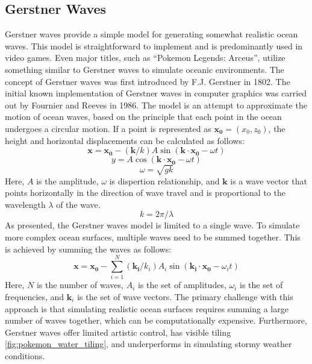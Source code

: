 \subsection{Gerstner Waves}
Gerstner waves provide a simple model for generating somewhat realistic ocean waves. This model is straightforward to implement and is predominantly used in video games. Even major titles, such as “Pokemon Legends: Arceus”, utilize something similar to Gerstner waves to simulate oceanic environments.
The concept of Gerstner waves was first introduced by F.J. Gerstner \cite{Franz1809} in 1802. The initial known implementation of Gerstner waves in computer graphics was carried out by Fournier and Reeves \cite{AlainWilliam1986} in 1986. The model is an attempt to approximate the motion of ocean waves, based on the principle that each point in the ocean undergoes a circular motion.
If a point is represented as $\mathbf{x_0} = (x_0, z_0)$, the height and horizontal displacements can be calculated as follows:
\begin{equation}
\mathbf{x} = \mathbf{x_0} - (\mathbf{k} / k) A \sin(\mathbf{k} \cdot \mathbf{x_0} - \omega t)
\end{equation}
\begin{equation}
    y = A \cos(\mathbf{k} \cdot \mathbf{x_0} - \omega t)
\end{equation}
\begin{equation}
    \omega = \sqrt{gk}
\end{equation}
Here, $A$ is the amplitude, $\omega$ is dispertion relationship, and $\mathbf{k}$ is a wave vector that points horizontally in the direction of wave travel and is proportional to the wavelength $\lambda$ of the wave.
\begin{equation}
k = 2 \pi / \lambda
\end{equation}
As presented, the Gerstner waves model is limited to a single wave. To simulate more complex ocean surfaces, multiple waves need to be summed together. This is achieved by summing the waves as follows:
\begin{equation}
\mathbf{x} = \mathbf{x_0} - \sum_{i=1}^{N} (\mathbf{k_i} / k_i) A_i \sin(\mathbf{k_i} \cdot \mathbf{x_0} - \omega_i t)
\end{equation}
Here, $N$ is the number of waves, $A_i$ is the set of amplitudes, $\omega_i$ is the set of frequencies, and $\mathbf{k}_i$ is the set of wave vectors.
The primary challenge with this approach is that simulating realistic ocean surfaces requires summing a large number of waves together, which can be computationally expensive. 
Furthermore, Gerstner waves offer limited artistic control, has visible tiling \ref{fig:pokemon_water_tiling}, and underperforms in simulating stormy weather conditions.

